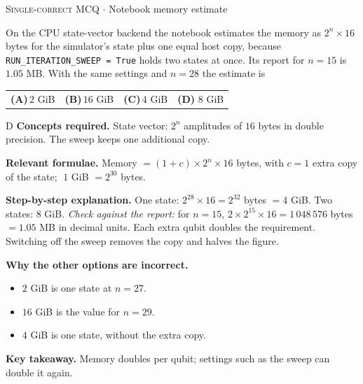 \documentclass[11pt,a4paper]{article}
\newcommand{\optlabel}[1]{\textbf{(#1)}}
\newcommand{\correctlabel}[1]{\textcolor{okgreen}{\textbf{(#1)}\,\ding{51}}}
\newenvironment{qitem}[1]{\begin{list}{}{\setlength{\leftmargin}{3.3em}\setlength{\labelwidth}{3.1em}%
  \setlength{\labelsep}{0.2em}\setlength{\topsep}{3pt}\setlength{\parsep}{3pt}}\item[\textbf{Q.#1}\hfill]}{\end{list}}
\newcommand{\qsep}{\par\vspace{2pt}{\color{black!15}\hrule}\vspace{4pt}}
\newcommand{\qmeta}[2]{{\footnotesize\color{black!60}\textsc{#1} \;$\cdot$\; #2}\par}
\begin{document}
\begin{qitem}{67}
\qmeta{Single-correct MCQ}{Notebook memory estimate}
On the CPU state-vector backend the notebook estimates the memory as $2^n \times 16$ bytes for the simulator's state plus one equal host copy, because \texttt{RUN\_ITERATION\_SWEEP = True} holds two states at once. Its report for $n = 15$ is $1.05$ MB. With the same settings and $n = 28$ the estimate is
\par\smallskip\noindent\begin{tabularx}{\linewidth}{@{}*{4}{L}@{}}
\optlabel{A}\,$2$ GiB & \optlabel{B}\,$16$ GiB & \optlabel{C}\,$4$ GiB & \correctlabel{D}\,$8$ GiB
\end{tabularx}
\end{qitem}
\begin{solbox}{D}
\textbf{\color{brand}Concepts required.} State vector: $2^n$ amplitudes of $16$ bytes in double precision. The sweep keeps one additional copy.

\textbf{\color{brand}Relevant formulae.} Memory $= (1 + c)\times2^n\times16$ bytes, with $c = 1$ extra copy of the state; $\;1$ GiB $= 2^{30}$ bytes.

\textbf{\color{brand}Step-by-step explanation.} One state: $2^{28}\times16 = 2^{32}$ bytes $= 4$ GiB. Two states: $8$ GiB. \emph{Check against the report:} for $n = 15$, $2\times2^{15}\times16 = 1\,048\,576$ bytes $= 1.05$ MB in decimal units. Each extra qubit doubles the requirement.
Switching off the sweep removes the copy and halves the figure.

\textbf{\color{brand}Why the other options are incorrect.}
\begin{itemize}[leftmargin=2.4em, itemsep=1pt, topsep=2pt]
\item[\textbf{(A)}] $2$ GiB is one state at $n = 27$.
\item[\textbf{(B)}] $16$ GiB is the value for $n = 29$.
\item[\textbf{(C)}] $4$ GiB is one state, without the extra copy.
\end{itemize}
\textbf{\color{brand}Key takeaway.} Memory doubles per qubit; settings such as the sweep can double it again.
\end{solbox}
\qsep
\end{document}
